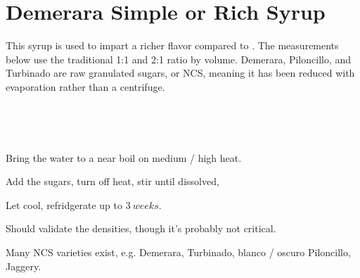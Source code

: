 \section[Demerara Syrup]{Demerara Simple or Rich Syrup}


\begin{recipestats}[
	servings=$\approx~1~Cup$,
	preptime=5~\minute,
	source=Mike \& Jane,
	original=\citefield{cocktailSeminars2021}{title}~\cite{cocktailSeminars2021},
]
\end{recipestats}

\begin{recipeabstract}
	This syrup is used to impart a richer flavor compared to .
	The measurements below use the traditional 1:1 and 2:1 ratio by volume.
	Demerara, Piloncillo, and Turbinado are raw granulated sugars, or \gls{NCS},
		meaning it has been reduced with evaporation rather than a centrifuge\cite{worldSugarGuide}.
\end{recipeabstract}

\begin{ingredientcolumns}
	\begin{ingredientblock}[simple]
		\\
	\end{ingredientblock}

	\begin{ingredientblock}[rich]
		\\
	\end{ingredientblock}
\end{ingredientcolumns}


\begin{preparation}
\item Bring the water to a near boil on medium / high heat.
\item Add the sugars, turn off heat, stir until dissolved,
\item Let cool, refridgerate up to $3~weeks$.
\end{preparation}

\begin{experiments}
\item Should validate the densities, though it's probably not critical.
\end{experiments}

\begin{variation}
\item Many \gls{NCS} varieties exist, e.g. Demerara, Turbinado, blanco / oscuro Piloncillo, Jaggery.
\end{variation}


\recipeend%
